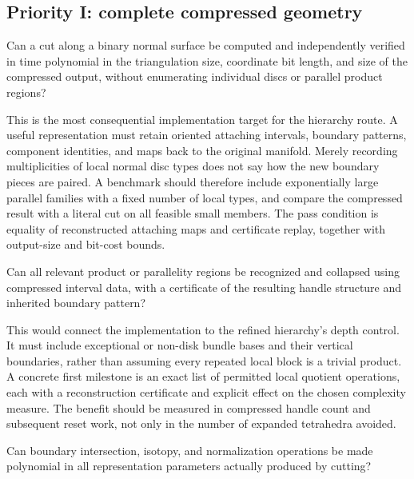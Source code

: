 \subsection{Priority I: complete compressed geometry}

\begin{question}
Can a cut along a binary normal surface be computed and independently
verified in time polynomial in the triangulation size, coordinate bit
length, and size of the compressed output, without enumerating individual
discs or parallel product regions?
\end{question}

This is the most consequential implementation target for the hierarchy
route. A useful representation must retain oriented attaching intervals,
boundary patterns, component identities, and maps back to the original
manifold. Merely recording multiplicities of local normal disc types does
not say how the new boundary pieces are paired. A benchmark should therefore
include exponentially large parallel families with a fixed number of local
types, and compare the compressed result with a literal cut on all feasible
small members. The pass condition is equality of reconstructed attaching
maps and certificate replay, together with output-size and bit-cost bounds.

\begin{question}
Can all relevant product or parallelity regions be recognized and collapsed
using compressed interval data, with a certificate of the resulting handle
structure and inherited boundary pattern?
\end{question}

This would connect the implementation to the refined hierarchy's depth
control. It must include exceptional or non-disk bundle bases and their
vertical boundaries, rather than assuming every repeated local block is a
trivial product. A concrete first milestone is an exact list of permitted
local quotient operations, each with a reconstruction certificate and
explicit effect on the chosen complexity measure. The benefit should be
measured in compressed handle count and subsequent reset work, not only in
the number of expanded tetrahedra avoided.

\begin{question}
Can boundary intersection, isotopy, and normalization operations be made
polynomial in all representation parameters actually produced by cutting?
\end{question}

